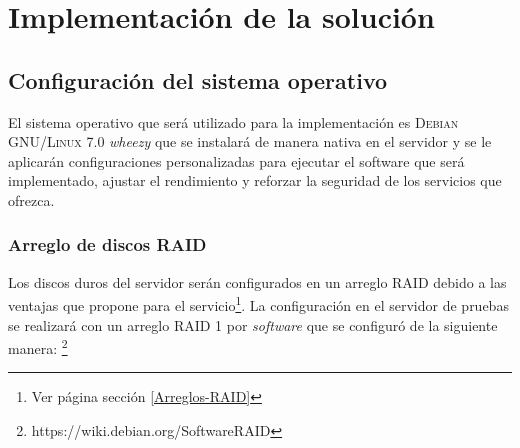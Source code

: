   \label{chap:cap3}

  \chapter {Implementaci\'{o}n de la soluci\'{o}n}

    \section {Configuraci\'{o}n del sistema operativo}

El sistema operativo que ser\'{a} utilizado para la implementaci\'{o}n es \textsc{Debian GNU/Linux} 7.0 \textit{\guillemotleft wheezy\guillemotright} que se instalar\'{a} de manera nativa en el servidor y se le aplicar\'{a}n configuraciones personalizadas para ejecutar el software que ser\'{a} implementado, ajustar el rendimiento y reforzar la seguridad de los servicios que ofrezca.

      \subsection {Arreglo de discos RAID}

Los discos duros del servidor ser\'{a}n configurados en un arreglo RAID debido a las ventajas que propone para el servicio\footnote{Ver p\'{a}gina \pageref{Arreglos-RAID} secci\'{o}n \ref{Arreglos-RAID}}. La configuraci\'{o}n en el servidor de pruebas se realizar\'{a} con un arreglo RAID 1 por \textit{software} que se configur\'{o} de la siguiente manera: \footnote{https://wiki.debian.org/SoftwareRAID}


